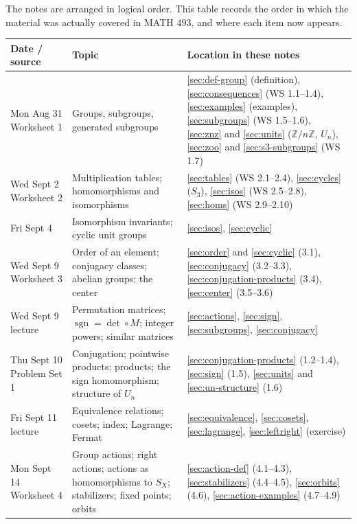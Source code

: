 \documentclass[11pt]{report}
\newcommand{\sgn}{\operatorname{sgn}}
\begin{document}
The notes are arranged in logical order. This table records the order in which the material was actually covered in MATH 493, and where each item now appears.

{\renewcommand{\arraystretch}{1.25}
\begin{longtable}{p{3.4cm}p{4.2cm}p{6.4cm}}
\textbf{Date / source} & \textbf{Topic} & \textbf{Location in these notes} \\ \hline
Mon Aug 31 \newline Worksheet 1 & Groups, subgroups, generated subgroups & \ref{sec:def-group} (definition), \ref{sec:consequences} (WS 1.1--1.4), \ref{sec:examples} (examples), \ref{sec:subgroups} (WS 1.5--1.6), \ref{sec:znz} and \ref{sec:units} ($\mathbb{Z}/n\mathbb{Z}$, $U_n$), \ref{sec:zoo} and \ref{sec:s3-subgroups} (WS 1.7) \\
Wed Sept 2 \newline Worksheet 2 & Multiplication tables; homomorphisms and isomorphisms & \ref{sec:tables} (WS 2.1--2.4), \ref{sec:cycles} ($S_3$), \ref{sec:isos} (WS 2.5--2.8), \ref{sec:homs} (WS 2.9--2.10) \\
Fri Sept 4 & Isomorphism invariants; cyclic unit groups & \ref{sec:isos}, \ref{sec:cyclic} \\
Wed Sept 9 \newline Worksheet 3 & Order of an element; conjugacy classes; abelian groups; the center & \ref{sec:order} and \ref{sec:cyclic} (3.1), \ref{sec:conjugacy} (3.2--3.3), \ref{sec:conjugation-products} (3.4), \ref{sec:center} (3.5--3.6) \\
Wed Sept 9 \newline lecture & Permutation matrices; $\sgn = \det \circ M$; integer powers; similar matrices & \ref{sec:actions}, \ref{sec:sign}, \ref{sec:subgroups}, \ref{sec:conjugacy} \\
Thu Sept 10 \newline Problem Set 1 & Conjugation; pointwise products; products; the sign homomorphism; structure of $U_n$ & \ref{sec:conjugation-products} (1.2--1.4), \ref{sec:sign} (1.5), \ref{sec:units} and \ref{sec:un-structure} (1.6) \\
Fri Sept 11 \newline lecture & Equivalence relations; cosets; index; Lagrange; Fermat & \ref{sec:equivalence}, \ref{sec:cosets}, \ref{sec:lagrange}, \ref{sec:leftright} (exercise) \\
Mon Sept 14 \newline Worksheet 4 & Group actions; right actions; actions as homomorphisms to $S_X$; stabilizers; fixed points; orbits & \ref{sec:action-def} (4.1--4.3), \ref{sec:stabilizers} (4.4--4.5), \ref{sec:orbits} (4.6), \ref{sec:action-examples} (4.7--4.9) \\

\end{longtable}}
\end{document}
